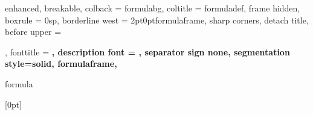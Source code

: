 \newcommand{\problem}[2]
{%
  \begin{Problem}{#1}{}
    #2
  \end{Problem}
}%



{%
  enhanced,
  breakable,
  colback = formulabg,
  coltitle = formuladef,
  frame hidden,
  boxrule = 0sp,
  borderline west = {2pt}{0pt}{formulaframe},
  sharp corners,
  detach title,
  before upper = \tcbtitle\par\smallskip,
  fonttitle = \bfseries\sffamily,
  description font = \mdseries,
  separator sign none,
  segmentation style={solid, formulaframe},
}
{formula}

\newcommand{\formula}[2]
{%
  \begin{Formula}{#1}{}
    #2
  \end{Formula}
}%

[0pt]{\normalsize\bfseries\protect\addvspace{15pt}}%
{}{\partname{} }%
{\enspace\titlerule\contentspage}%
